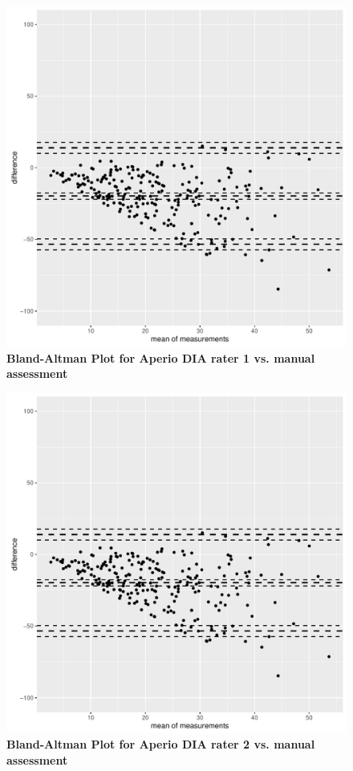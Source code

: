 \documentclass[final,5p,times,twocolumn]{elsarticle}
\begin{document}
\begin{figure}
\includegraphics[page=1, scale=0.4]{baplot.pdf}
\centering
\caption{{\bf Bland-Altman Plot for Aperio DIA rater 1 vs. manual assessment}}
\label{baplot1}
\end{figure}


\begin{figure}
\includegraphics[page=2, scale=0.4]{baplot.pdf}
\centering
\caption{{\bf Bland-Altman Plot for Aperio DIA rater 2 vs. manual assessment}}
\label{baplot2}
\end{figure}
\end{document}
